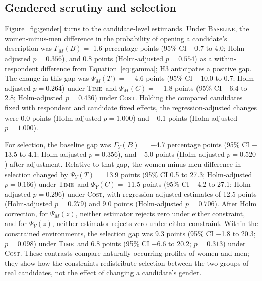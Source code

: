 \documentclass[11pt]{article}\usepackage[]{graphicx}\usepackage[]{xcolor}
\newcommand{\armT}{\textsc{Time}}
\newcommand{\armC}{\textsc{Cost}}
\newcommand{\armB}{\textsc{Baseline}}
\begin{document}
\subsection{Gendered scrutiny and selection}

Figure~\ref{fig:gender} turns to the candidate-level estimands. Under \armB, the women-minus-men difference in the probability of opening a candidate's description was $\Gamma_M(B)=$ 1.6 percentage points (95\% CI $-$0.7 to 4.0; Holm-adjusted $p=0.356$), and 0.8 points (Holm-adjusted $p=0.554$) as a within-respondent difference from Equation~\eqref{eq:gamma}; H3 anticipates a positive gap. The change in this gap was $\Psi_M(T)=$ $-$4.6 points (95\% CI $-$10.0 to 0.7; Holm-adjusted $p=0.264$) under \armT\ and $\Psi_M(C)=$ $-$1.8 points (95\% CI $-$6.4 to 2.8; Holm-adjusted $p=0.436$) under \armC. Holding the compared candidates fixed with respondent and candidate fixed effects, the regression-adjusted changes were 0.0 points (Holm-adjusted $p=1.000$) and $-$0.1 points (Holm-adjusted $p=1.000$).

For selection, the baseline gap was $\Gamma_Y(B)=$ $-$4.7 percentage points (95\% CI $-$13.5 to 4.1; Holm-adjusted $p=0.356$), and $-$5.0 points (Holm-adjusted $p=0.520$) after adjustment. Relative to that gap, the women-minus-men difference in selection changed by $\Psi_Y(T)=$ 13.9 points (95\% CI 0.5 to 27.3; Holm-adjusted $p=0.166$) under \armT\ and $\Psi_Y(C)=$ 11.5 points (95\% CI $-$4.2 to 27.1; Holm-adjusted $p=0.296$) under \armC, with regression-adjusted estimates of 12.5 points (Holm-adjusted $p=0.279$) and 9.0 points (Holm-adjusted $p=0.706$). After Holm correction, for $\Psi_M(z)$, neither estimator rejects zero under either constraint, and for $\Psi_Y(z)$, neither estimator rejects zero under either constraint. Within the constrained environments, the selection gap was 9.3 points (95\% CI $-$1.8 to 20.3; $p=0.098$) under \armT\ and 6.8 points (95\% CI $-$6.6 to 20.2; $p=0.313$) under \armC. These contrasts compare naturally occurring profiles of women and men; they show how the constraints redistribute selection between the two groups of real candidates, not the effect of changing a candidate's gender.
\end{document}
